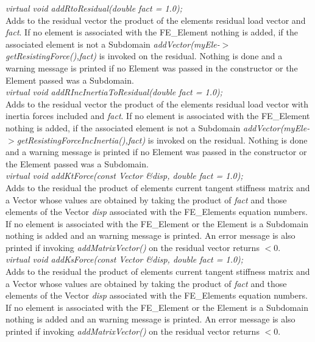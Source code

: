 {\em virtual void addRtoResidual(double fact = 1.0); }\\
Adds to the residual vector the product of the elements residual load
vector and {\em fact}. If no element is associated with the
FE\_Element nothing is added, if the associated element is not a
Subdomain {\em addVector(myEle-$>$getResistingForce(),fact)} is
invoked on the residual. Nothing is done and a warning message is
printed if no Element was passed in the constructor or the Element
passed was a Subdomain. \\   

{\em virtual void addRIncInertiaToResidual(double fact = 1.0); }\\
Adds to the residual vector the product of the elements residual load
vector with inertia forces included and {\em fact}. If no element is
associated with the FE\_Element nothing is added, if the associated
element is not a Subdomain {\em
addVector(myEle-$>$getResistingForceIncInertia(),fact)} is 
invoked on the residual. Nothing is done and a warning message is
printed if no Element was passed in the constructor or the Element
passed was a Subdomain. \\   

{\em virtual void addKtForce(const Vector \&disp, double fact = 1.0);    }\\
Adds to the residual the product of elements current tangent stiffness matrix
and a Vector whose values are obtained by taking the product of {\em
fact} and those elements of the Vector {\em disp} associated with 
the FE\_Elements equation numbers. If no element is associated with the
FE\_Element or the Element is a Subdomain nothing is added and an
warning message is printed. An error message is also printed if invoking
{\em addMatrixVector()} on the residual vector returns $< 0$.\\

{\em virtual void addKsForce(const Vector \&disp, double fact = 1.0);    }\\
Adds to the residual the product of elements current tangent stiffness matrix
and a Vector whose values are obtained by taking the product of {\em
fact} and those elements of the Vector {\em disp} associated with 
the FE\_Elements equation numbers. If no element is associated with the
FE\_Element or the Element is a Subdomain nothing is added and an
warning message is printed. An error message is also printed if invoking
{\em addMatrixVector()} on the residual vector returns $< 0$.\\


